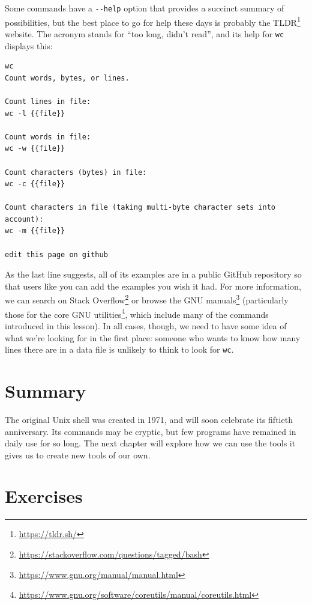 \documentclass[
]{krantz}
\renewcommand{\href}[2]{#2\footnote{\url{#1}}}
\begin{document}
Some commands have a \texttt{-\/-help} option that provides a succinct summary of possibilities,
but the best place to go for help these days is probably the \href{https://tldr.sh/}{TLDR} website.
The acronym stands for ``too long, didn't read'',
and its help for \texttt{wc} displays this:

\begin{verbatim}
wc
Count words, bytes, or lines.

Count lines in file:
wc -l {{file}}

Count words in file:
wc -w {{file}}

Count characters (bytes) in file:
wc -c {{file}}

Count characters in file (taking multi-byte character sets into account):
wc -m {{file}}

edit this page on github
\end{verbatim}

As the last line suggests,
all of its examples are in a public GitHub repository
so that users like you can add the examples you wish it had.
For more information,
we can search on \href{https://stackoverflow.com/questions/tagged/bash}{Stack Overflow}
or browse the \href{https://www.gnu.org/manual/manual.html}{GNU manuals}
(particularly those for the \href{https://www.gnu.org/software/coreutils/manual/coreutils.html}{core GNU utilities},
which include many of the commands introduced in this lesson).
In all cases,
though,
we need to have some idea of what we're looking for in the first place:
someone who wants to know how many lines there are in a data file
is unlikely to think to look for \texttt{wc}.

\hypertarget{bash-basics-summary}{%
\section{Summary}\label{bash-basics-summary}}

The original Unix shell was created in 1971,
and will soon celebrate its fiftieth anniversary.
Its commands may be cryptic,
but few programs have remained in daily use for so long.
The next chapter will explore how we can use the tools it gives us
to create new tools of our own.

\hypertarget{bash-basics-exercises}{%
\section{Exercises}\label{bash-basics-exercises}}
\end{document}
